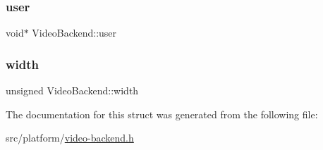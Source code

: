 \mbox{\label{struct_video_backend_a825c0ad8dc1cb037c5c467f5d7b5dc48}} 
\subsubsection{\texorpdfstring{user}{user}}
{\footnotesize\ttfamily void$\ast$ Video\+Backend\+::user}

\mbox{\label{struct_video_backend_a462affa3c14c45e8b0dae4c5f8dfa205}} 
\subsubsection{\texorpdfstring{width}{width}}
{\footnotesize\ttfamily unsigned Video\+Backend\+::width}



The documentation for this struct was generated from the following file\+:\begin{DoxyCompactItemize}
\item 
src/platform/\mbox{\hyperlink{video-backend_8h}{video-\/backend.\+h}}\end{DoxyCompactItemize}
